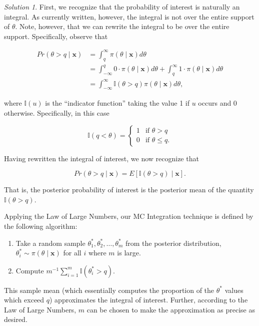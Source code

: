 \documentclass[
  letterpaper,
  DIV=11,
  numbers=noendperiod]{scrreprt}
\providecommand{\tightlist}{%
  \setlength{\itemsep}{0pt}\setlength{\parskip}{0pt}}\usepackage{longtable,booktabs,array}
\theoremstyle{definition}
\theoremstyle{definition}
\theoremstyle{plain}
\theoremstyle{remark}
\newtheorem*{solution}{Solution}
\begin{document}
\begin{solution}

First, we recognize that the probability of interest is naturally an
integral. As currently written, however, the integral is not over the
entire support of \(\theta\). Note, however, that we can rewrite the
integral to be over the entire support. Specifically, observe that

\[
\begin{aligned}
  Pr(\theta > q \mid \mathbf{x})
    &= \int_{q}^{\infty} \pi(\theta \mid \mathbf{x}) d\theta \\
    &= \int_{-\infty}^{q} 0 \cdot \pi(\theta \mid \mathbf{x}) d\theta + \int_{q}^{\infty} 1 \cdot \pi(\theta \mid \mathbf{x}) d\theta \\
    &= \int_{-\infty}^{\infty} \mathbb{I}(\theta > q) \pi(\theta \mid \mathbf{x}) d\theta,
\end{aligned}
\]

where \(\mathbb{I}(u)\) is the ``indicator function'' taking the value 1
if \(u\) occurs and 0 otherwise. Specifically, in this case

\[\mathbb{I}(q < \theta) = \begin{cases} 1 & \text{if } \theta > q \\ 0 & \text{if } \theta \leq q. \end{cases}\]

Having rewritten the integral of interest, we now recognize that

\[Pr(\theta > q \mid \mathbf{x}) = E\left[\mathbb{I}(\theta > q) \mid \mathbf{x}\right].\]

That is, the posterior probability of interest is the posterior mean of
the quantity \(\mathbb{I}(\theta > q)\).

Applying the Law of Large Numbers, our MC Integration technique is
defined by the following algorithm:

\begin{enumerate}
\def\labelenumi{\arabic{enumi}.}
\tightlist
\item
  Take a random sample \(\theta^*_1, \theta^*_2, \dotsc, \theta^*_m\)
  from the posterior distribution,
  \(\theta^*_i \sim \pi(\theta \mid \mathbf{x})\) for all \(i\) where
  \(m\) is large.
\item
  Compute
  \(m^{-1} \sum_{i=1}^{m} \mathbb{I}\left(\theta^*_i > q\right)\).
\end{enumerate}

This sample mean (which essentially computes the proportion of the
\(\theta^*\) values which exceed \(q\)) approximates the integral of
interest. Further, according to the Law of Large Numbers, \(m\) can be
chosen to make the approximation as precise as desired.

\end{solution}
\end{document}
